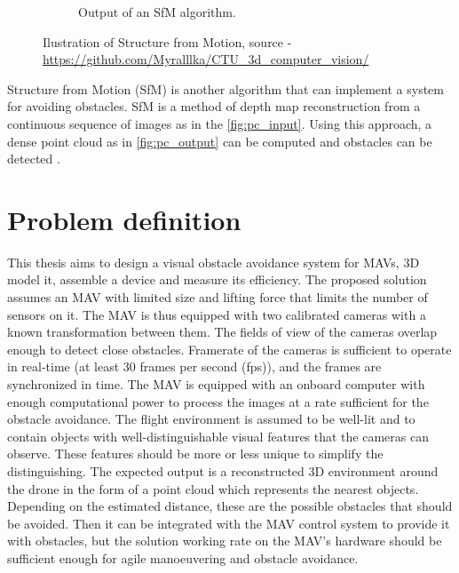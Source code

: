 \begin{figure}[h]
\begin{subfigure}[h]{0.65\textwidth}
      \caption{Output of an SfM algorithm.}
      \label{fig:pc_output}
    \end{subfigure}
    \caption{Ilustration of Structure from Motion, source - \url{https://github.com/Myralllka/CTU_3d_computer_vision/}}
    \label{fig:pc_recons}
\end{figure}

Structure from Motion (SfM) is another algorithm that can implement a system for avoiding obstacles. 
SfM is a method of depth map reconstruction from a continuous sequence of images as in the \autoref{fig:pc_input}.
Using this approach, a dense point cloud as in \autoref{fig:pc_output} can be computed and obstacles can be detected \cite{Lee2008}. 

\section{Problem definition}
\label{sec:problem_definition}
This thesis aims to design a visual obstacle avoidance system for MAVs, 3D model it, assemble a device and measure its efficiency. 
The proposed solution assumes an MAV with limited size and lifting force that limits the number of sensors on it. 
The MAV is thus equipped with two calibrated cameras with a known transformation between them. 
The fields of view of the cameras overlap enough to detect close obstacles.
Framerate of the cameras is sufficient to operate in real-time (at least 30 frames per second (fps)), and the frames are synchronized in time.
The MAV is equipped with an onboard computer with enough computational power to process the images at a rate sufficient for the obstacle avoidance.
The flight environment is assumed to be well-lit and to contain objects with well-distinguishable visual features that the cameras can observe.
These features should be more or less unique to simplify the distinguishing.
The expected output is a reconstructed 3D environment around the drone in the form of a point cloud which represents the nearest objects.
Depending on the estimated distance, these are the possible obstacles that should be avoided.
Then it can be integrated with the MAV control system to provide it with obstacles, but the solution working rate on the MAV's hardware should be sufficient enough for agile manoeuvering and obstacle avoidance.

